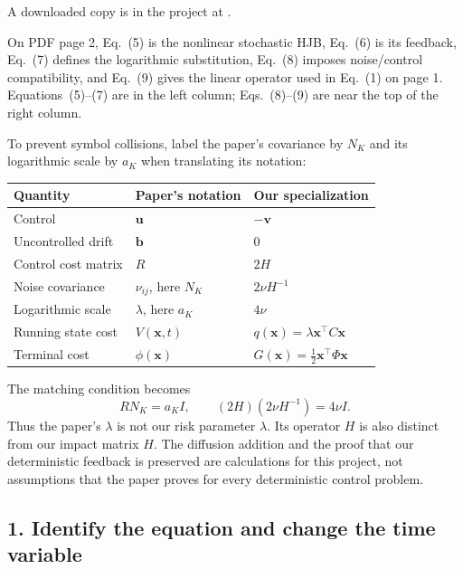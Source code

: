\documentclass[11pt,a4paper]{article}
\begin{document}
A downloaded copy is in the project at
.

On PDF page 2, Eq.~(5) is the nonlinear stochastic HJB, Eq.~(6) is its
feedback, Eq.~(7) defines the logarithmic substitution, Eq.~(8) imposes
noise/control compatibility, and Eq.~(9) gives the linear operator used
in Eq.~(1) on page 1. Equations~(5)--(7) are in the left column;
Eqs.~(8)--(9) are near the top of the right column.

To prevent symbol collisions, label the paper's covariance by $N_K$
and its logarithmic scale by $a_K$ when translating its notation:
\begin{center}
\begin{tabular}{lll}
Quantity & Paper's notation & Our specialization\\\hline
Control & $\mathbf u$ & $-\mathbf v$\\
Uncontrolled drift & $\mathbf b$ & $0$\\
Control cost matrix & $R$ & $2H$\\
Noise covariance & $\nu_{ij}$, here $N_K$ & $2\nu H^{-1}$\\
Logarithmic scale & $\lambda$, here $a_K$ & $4\nu$\\
Running state cost & $V(\mathbf x,t)$ & $q(\mathbf x)=\lambda\mathbf x^\top C\mathbf x$\\
Terminal cost & $\phi(\mathbf x)$ & $G(\mathbf x)=\tfrac12\mathbf x^\top\Phi\mathbf x$
\end{tabular}
\end{center}
The matching condition becomes
\begin{equation}
 R N_K=a_K I,\qquad
 (2H)(2\nu H^{-1})=4\nu I.
 \label{eq:stage4-paper-map}
\end{equation}
Thus the paper's $\lambda$ is not our risk parameter $\lambda$.
Its operator $H$ is also distinct from our impact matrix $H$.
The diffusion addition and the proof that our deterministic feedback is
preserved are calculations for this project, not assumptions that the
paper proves for every deterministic control problem.

\subsection*{1. Identify the equation and change the time variable}
\end{document}
